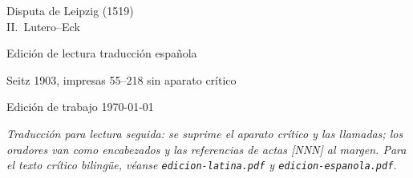 \documentclass[11pt,a4paper,twoside]{article}
\begin{document}
\begin{titlepage}
\centering
{\LARGE Disputa de Leipzig (1519)\\II.\ Lutero--Eck\par}
\vspace{1em}
{\large Edici\'on de lectura \textperiodcentered{} traducci\'on espa\~nola\par}
\vspace{2em}
{\normalsize Seitz 1903, impresas 55--218 \textperiodcentered{} sin aparato cr\'itico\par}
\vfill
{\small Edici\'on de trabajo \textperiodcentered{} \today\par}
\end{titlepage}
\noindent\textit{Traducci\'on para lectura seguida: se suprime el aparato cr\'itico y las llamadas; los oradores van como encabezados y las referencias de actas [NNN] al margen. Para el texto cr\'itico biling\"ue, v\'eanse \texttt{edicion-latina.pdf} y \texttt{edicion-espanola.pdf}.}

\bigskip



\end{document}
